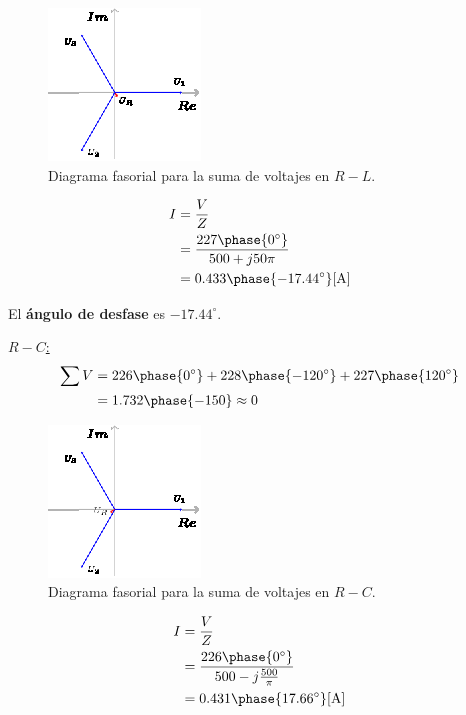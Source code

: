 \documentclass[letter,11pt]{article}
\begin{document}
\begin{enumerate}
\begin{figure}[!h]
\centering
\includegraphics[scale=3.5]{figura1.eps}
\caption{Diagrama fasorial para la suma de voltajes en $R-L$.}
\end{figure}

\begin{equation*}
    \begin{split}
        I &=\frac{V}{Z}\\
          &=\frac{227\phase{0^{\circ}}}{500+j50\pi}\\
          &=0.433\phase{-17.44^{\circ}}[\text{A}]\\
    \end{split}
\end{equation*}

El \textbf{ángulo de desfase} es $-17.44^{\circ}$.

\underline{$R-C$:}
\begin{equation*}
    \begin{split}
        \sum V &= 226\phase{0^{\circ}}+228\phase{-120^{\circ}}+227\phase{120^{\circ}}\\
               &= 1.732\phase{-150} \approx 0
    \end{split}
\end{equation*}

\begin{figure}[!h]
\centering
\includegraphics[scale=3.5]{figura2.eps}
\caption{Diagrama fasorial para la suma de voltajes en $R-C$.}
\end{figure}

\begin{equation*}
    \begin{split}
        I &=\frac{V}{Z}\\
          &=\frac{226\phase{0^{\circ}}}{500-j\frac{500}{\pi}}\\
          &=0.431\phase{17.66^{\circ}}[\text{A}]\\
    \end{split}
\end{equation*}


\end{enumerate}
\end{document}
